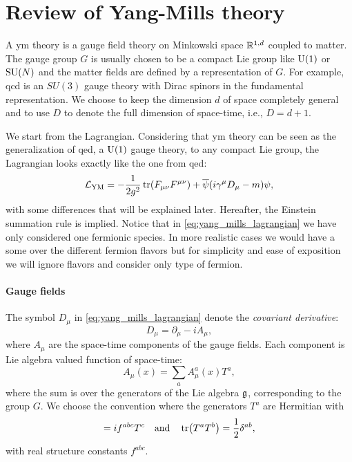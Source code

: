 \section{Review of Yang-Mills theory}
\label{sec:yang_mills_theory}

A \ac{ym} theory is a gauge field theory on Minkowski space $\mathbb{R}^{1,d}$ coupled to matter.
    The gauge group $G$ is usually chosen to be a compact Lie group like $\mathrm{U}(1)$ or $\text{SU}(N)$ and the matter fields are defined by a representation of $G$.
    For example, \ac{qcd} is an $SU(3)$ gauge theory with Dirac spinors in the fundamental representation.
We choose to keep the dimension $d$ of space completely general and to use $D$ to denote the full dimension of space-time, i.e., $D=d+1$.

We start from the Lagrangian.
Considering that \ac{ym} theory can be seen as the generalization of \ac{qed}, a $\mathrm{U}(1)$ gauge theory, to any compact Lie group, the Lagrangian looks exactly like the one from \ac{qed}:
\begin{equation}
    \mathcal{L}_{\text{YM}} = - \frac{1}{2 g^2} \tr(F_{\mu \nu} F^{\mu \nu}) + \overline{\psi} \qty( i \gamma^{\mu} D_{\mu} - m ) \psi,
    \label{eq:yang_mills_lagrangian}
\end{equation}
with some differences that will be explained later.
Hereafter, the Einstein summation rule is implied.
Notice that in \eqref{eq:yang_mills_lagrangian} we have only considered one fermionic species.
In more realistic cases we would have a some over the different fermion flavors but for simplicity and ease of exposition we will ignore flavors and consider only type of fermion.

\paragraph*{Gauge fields}

The symbol $D_{\mu}$ in \eqref{eq:yang_mills_lagrangian} denote the \emph{covariant derivative}:
\begin{equation}
    D_{\mu} = \partial_{\mu} - i A_{\mu},
\end{equation}
where $A_{\mu}$ are the space-time components of the gauge fields.
Each component is Lie algebra valued function of space-time:
\begin{equation}
    A_{\mu}(x) = \sum_{a} A_{\mu}^a(x) T^a,
\end{equation}
where the sum is over the generators of the Lie algebra $\mathfrak{g}$, corresponding to the group $G$.
We choose the convention where the generators $T^a$ are Hermitian with
\begin{equation}
    [T^a, T^b] = i f^{abc} T^c
    \qand
    \tr(T^a T^b) = \frac{1}{2} \delta^{ab},
\end{equation}
with real structure constants $f^{abc}$.

